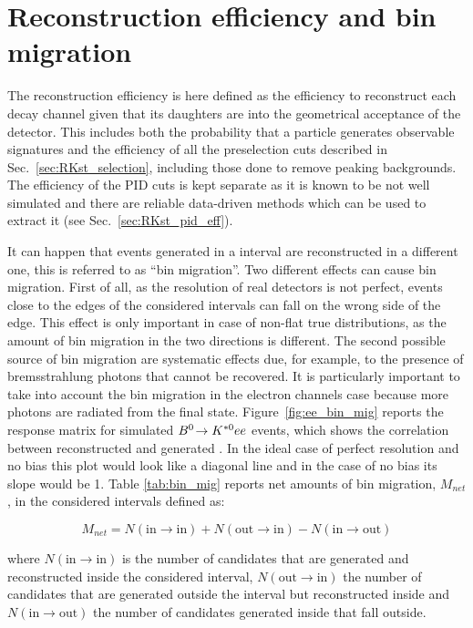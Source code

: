 \section{Reconstruction efficiency and bin migration}

The reconstruction efficiency is here defined as the efficiency to reconstruct
each decay channel given that its daughters are into the geometrical acceptance
of the detector. This includes both the probability that a particle generates
observable signatures and the efficiency of all the preselection cuts described in Sec.~\ref{sec:RKst_selection},
including those done to remove peaking backgrounds. 
The efficiency of the PID cuts is kept separate as it is known to be not well simulated
and there are reliable data-driven methods which can be used to extract it (see Sec.~\ref{sec:RKst_pid_eff}).

It can happen that events generated in a \qsq interval are reconstructed in a different one,
this is referred to as ``bin migration''. Two different effects can cause bin migration.
First of all, as the resolution of real detectors is not perfect, events close to the edges
of the considered intervals can fall on the wrong side of the edge. This effect is only important
in case of non-flat true distributions, as the amount of bin migration in the two directions is different.
The second possible source of bin migration are systematic effects due, for example,
to the presence of bremsstrahlung photons that cannot be recovered.
It is particularly important to take into account the bin migration in the electron channels case 
because more photons are radiated from the final state.
Figure~\ref{fig:ee_bin_mig} reports the response matrix for simulated ${{B}^0}\!\rightarrow {\ensuremath{{K}^{*0}}} ee$ events,
which shows the correlation between reconstructed and generated \qsq. In the ideal case of
perfect resolution and no bias this plot would look like a diagonal line and in the case of no bias
its slope would be 1.
Table \ref{tab:bin_mig} reports net amounts of bin migration, $M_{net}$, in the considered \qsq intervals defined as:

\begin{equation}
M_{net} = N(\text{in} \to \text{in}) + N(\text{out} \to \text{in}) - N(\text{in} \to \text{out}) 
\end{equation}

\noindent
where $N(\text{in} \to \text{in})$ is the number of candidates that are generated and
reconstructed inside the considered interval, $N(\text{out} \to \text{in})$ the number of 
candidates that are generated outside the interval but reconstructed inside and
$N(\text{in} \to \text{out})$ the number of candidates generated inside that fall outside.

